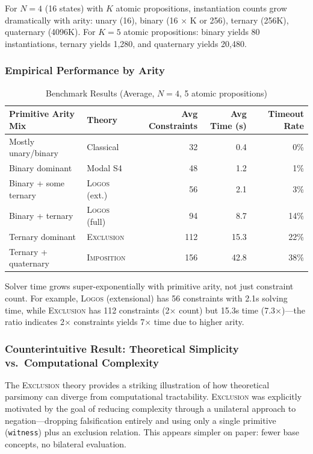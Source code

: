 \documentclass[pdflatex,sn-mathphys-num]{sn-jnl}
\newcommand{\theorylogos}{\textsc{Logos}}
\newcommand{\theoryexclusion}{\textsc{Exclusion}}
\newcommand{\theoryimposition}{\textsc{Imposition}}
\newcommand{\zwitness}{\texttt{witness}}
\theoremstyle{thmstyleone}
\theoremstyle{thmstyletwo}
\theoremstyle{thmstylethree}
\begin{document}
For $N=4$ (16 states) with $K$ atomic propositions, instantiation counts grow dramatically with arity: unary (16), binary (16 $\times$ K or 256), ternary (256K), quaternary (4096K).
For $K=5$ atomic propositions: binary yields 80 instantiations, ternary yields 1,280, and quaternary yields 20,480.

\subsubsection{Empirical Performance by Arity}

\begin{table}[htbp]
\centering
\caption{Benchmark Results (Average, $N=4$, 5 atomic propositions)}
\label{tab:benchmarks}
\begin{tabular}{@{}llrrr@{}}
\toprule
\textbf{Primitive Arity Mix} & \textbf{Theory} & \textbf{Avg Constraints} & \textbf{Avg Time (s)} & \textbf{Timeout Rate} \\
\midrule
Mostly unary/binary & Classical & 32 & 0.4 & 0\% \\
Binary dominant & Modal S4 & 48 & 1.2 & 1\% \\
Binary + some ternary & \theorylogos{} (ext.) & 56 & 2.1 & 3\% \\
Binary + ternary & \theorylogos{} (full) & 94 & 8.7 & 14\% \\
Ternary dominant & \theoryexclusion{} & 112 & 15.3 & 22\% \\
Ternary + quaternary & \theoryimposition{} & 156 & 42.8 & 38\% \\
\bottomrule
\end{tabular}
\end{table}

Solver time grows super-exponentially with primitive arity, not just constraint count.
For example, \theorylogos{} (extensional) has 56 constraints with 2.1s solving time, while \theoryexclusion{} has 112 constraints (2$\times$ count) but 15.3s time (7.3$\times$)---the ratio indicates 2$\times$ constraints yields 7$\times$ time due to higher arity.

\subsubsection{Counterintuitive Result: Theoretical Simplicity vs.\ Computational Complexity}

The \theoryexclusion{} theory provides a striking illustration of how theoretical parsimony can diverge from computational tractability.
\theoryexclusion{} was explicitly motivated by the goal of reducing complexity through a unilateral approach to negation---dropping falsification entirely and using only a single primitive (\zwitness{}) plus an exclusion relation.
This appears simpler on paper: fewer base concepts, no bilateral evaluation.
\end{document}
